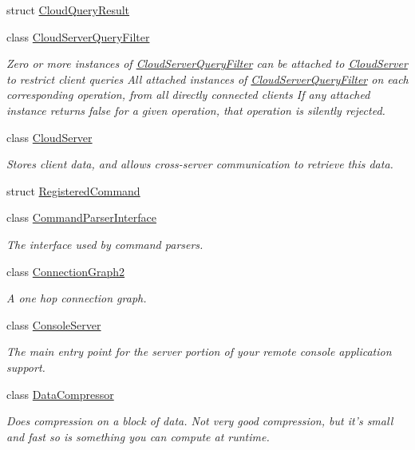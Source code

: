 \begin{DoxyCompactItemize}
struct \hyperlink{struct_rak_net_1_1_cloud_query_result}{Cloud\-Query\-Result}
\item 
class \hyperlink{class_rak_net_1_1_cloud_server_query_filter}{Cloud\-Server\-Query\-Filter}
\begin{DoxyCompactList}\small\item\em Zero or more instances of \hyperlink{class_rak_net_1_1_cloud_server_query_filter}{Cloud\-Server\-Query\-Filter} can be attached to \hyperlink{class_rak_net_1_1_cloud_server}{Cloud\-Server} to restrict client queries All attached instances of \hyperlink{class_rak_net_1_1_cloud_server_query_filter}{Cloud\-Server\-Query\-Filter} on each corresponding operation, from all directly connected clients If any attached instance returns false for a given operation, that operation is silently rejected. \end{DoxyCompactList}\item 
class \hyperlink{class_rak_net_1_1_cloud_server}{Cloud\-Server}
\begin{DoxyCompactList}\small\item\em Stores client data, and allows cross-\/server communication to retrieve this data. \end{DoxyCompactList}\item 
struct \hyperlink{struct_rak_net_1_1_registered_command}{Registered\-Command}
\item 
class \hyperlink{class_rak_net_1_1_command_parser_interface}{Command\-Parser\-Interface}
\begin{DoxyCompactList}\small\item\em The interface used by command parsers. \end{DoxyCompactList}\item 
class \hyperlink{class_rak_net_1_1_connection_graph2}{Connection\-Graph2}
\begin{DoxyCompactList}\small\item\em A one hop connection graph. \end{DoxyCompactList}\item 
class \hyperlink{class_rak_net_1_1_console_server}{Console\-Server}
\begin{DoxyCompactList}\small\item\em The main entry point for the server portion of your remote console application support. \end{DoxyCompactList}\item 
class \hyperlink{class_rak_net_1_1_data_compressor}{Data\-Compressor}
\begin{DoxyCompactList}\small\item\em Does compression on a block of data. Not very good compression, but it's small and fast so is something you can compute at runtime. \end{DoxyCompactList}\item 

\end{DoxyCompactItemize}

